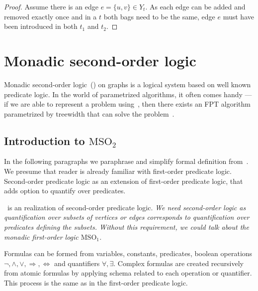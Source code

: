 %
%
\begin{proof}
	Assume there is an edge \( e = \{u, v\} \in Y_t \).
	As each edge can be added and removed exactly once
	and in a \JoinNode{} \( t \) both bags need to be the same,
	edge \( e \) must have been introduced in both \( t_1 \) and \( t_2 \).
\end{proof}
%

\section{Monadic second-order logic}

Monadic second-order logic~(\MSO{}) on graphs is a logical system based on
well known predicate logic.
In the world of parametrized algorithms,
it often comes handy --- if we are able to represent a problem using~\MSO{},
then there exists an FPT algorithm parametrized by treewidth
that can solve the problem~\cite{tree_width_mso}.

\subsection{Introduction to \( \text{MSO}_2 \)}

In the following paragraphs we paraphrase and simplify formal definition
from~\cite{book_parametrized_algorithms}.
We presume that reader is already familiar with first-order predicate logic.
Second-order predicate logic as an extension of first-order predicate logic,
that adds option to quantify over predicates.

\MSO{}~is an realization of second-order predicate logic.
\emph{
	We need second-order logic as quantification over subsets of vertices or edges
	corresponds to quantification over predicates defining the subsets.
	Without this requirement, we could talk
	about the monadic first-order logic \( \text{MSO}_1 \).
}

Formulas can be formed from
variables, constants, predicates,
boolean operations \( \lnot, \land, \lor, \Rightarrow, \Leftrightarrow \)
and quantifiers \( \forall, \exists \).
Complex formulas are created recursively from atomic formulas
by applying schema related to each operation or quantifier.
This process is the same as in the first-order predicate logic.


